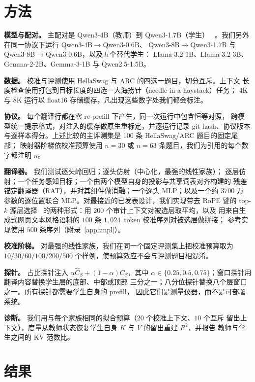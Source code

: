 \documentclass[10pt,a4paper,fontset=fandol]{ctexart}
\newcommand{\kv}{\ensuremath{\mathrm{KV}}}
\begin{document}
\section{方法}
\label{sec:method}

\textbf{模型与配对。} 主配对是 Qwen3-4B（教师）到 Qwen3-1.7B（学生）
~\citep{qwen3}。我们另外在同一协议下运行 Qwen3-4B$\to$Qwen3-0.6B、
Qwen3-8B$\to$Qwen3-1.7B 与 Qwen3-8B$\to$Qwen3-0.6B，以及五个替代学生：
Llama-3.2-1B、Llama-3.2-3B、Gemma-2-2B、Gemma-3-1B 与 Qwen2.5-1.5B。

\textbf{数据。} 校准与评测使用 HellaSwag 与 ARC 的四选一题目，切分互斥。上下文
长度检查使用打包到目标长度的四选一大海捞针（needle-in-a-haystack）任务；
$4$K 与 $8$K 运行以 float16 存储缓存，凡出现这些数字处我们都会标注。

\textbf{协议。} 每个翻译行都在零 re-prefill 下产生，同一次运行中包含恒等对照，
跨模型统一提示格式，对注入的缓存做原生重标定，并逐运行记录 git hash、协议版本
与逐样本得分。上述比较的主评测集是 $100$ 条 HellaSwag/ARC 题目的固定尾部；
映射器阶梯依校准预算使用 $n=30$ 或 $n=63$ 条题目，我们为引用的每个数字都注明
$n$。

\textbf{翻译器。} 我们测试逐头岭回归；逐头仿射（中心化，最强的线性家族）；
逐层仿射；一个任务感知目标；一个由两个模型自身的投影与共享词表对齐构建的
残差锚定翻译器（RAT），并对其组件做消融；一个逐头 MLP；以及一个约 $3700$ 万
参数的逐位置联合 MLP。对最接近的已发表设计，我们实现带去 RoPE 键的 top-$k$
源层选择~\citep{heo2026} 的两种形式：用 $200$ 个审计上下文对被选层取平均，以及
用来自生成式网页文本风格语料的 $100$ 条 $1{,}024$~token 校准序列对被选层做拼接；
参考实现使用 $500$ 条序列（附录~\ref{app:impl}）。

\textbf{校准阶梯。} 对最强的线性家族，我们在同一个固定评测集上把校准预算取为
$10/30/60/100/200/500$ 个样例，使预算效应不会与评测题目相混淆。

\textbf{探针。} 占比探针注入 $\alpha\widehat C_S+(1-\alpha)C_S$，其中
$\alpha\in\{0.25,0.5,0.75\}$；窗口探针用翻译内容替换学生层的底部、中部或顶部
三分之一；八分位探针替换八个层窗口之一。所有探针都需要学生自身的 prefill，
因此它们是测量仪器，而不是可部署系统。

\textbf{诊断。} 我们用与每个家族相同的拟合预算（$20$ 个校准上下文、$10$ 个互斥
留出上下文），度量从教师状态恢复学生自身 $K$ 与 $V$ 的留出重建 $R^2$，并报告
教师与学生之间的 \kv{} 范数比。

\section{结果}
\label{sec:results}
\end{document}
